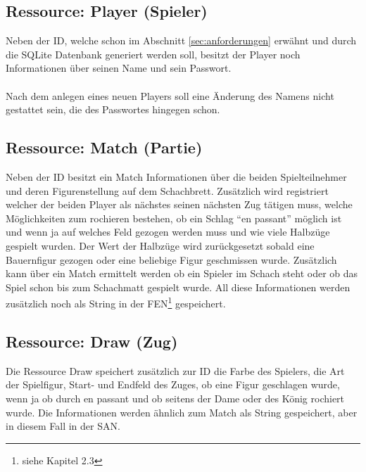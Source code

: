 \subsection{Ressource: Player (Spieler)}\label{sec:resplayer}
Neben der ID, welche schon im Abschnitt \ref{sec:anforderungen} erwähnt und durch die SQLite Datenbank generiert werden soll, besitzt der Player noch Informationen über seinen Name und sein Passwort.\\
\\
Nach dem anlegen eines neuen Players soll eine Änderung des Namens nicht gestattet sein, die des Passwortes hingegen schon.

\subsection{Ressource: Match (Partie)}\label{sec:resmatch}
Neben der ID besitzt ein Match Informationen über die beiden Spielteilnehmer und deren Figurenstellung auf dem Schachbrett. Zusätzlich wird registriert welcher der beiden Player als nächstes seinen nächsten Zug tätigen muss, welche Möglichkeiten zum rochieren bestehen, ob ein Schlag \enquote{en passant} möglich ist und wenn ja auf welches Feld gezogen werden muss und wie viele Halbzüge gespielt wurden. Der Wert der Halbzüge wird zurückgesetzt sobald eine Bauernfigur gezogen oder eine beliebige Figur geschmissen wurde. Zusätzlich kann über ein Match ermittelt werden ob ein Spieler im Schach steht oder ob das Spiel schon bis zum Schachmatt gespielt wurde. All diese Informationen werden zusätzlich noch als String in der \gls{FEN}\footnote{\label{foot:chapter}siehe Kapitel 2.3} gespeichert.

\subsection{Ressource: Draw (Zug)}\label{sec:resdraw}
Die Ressource Draw speichert zusätzlich zur ID die Farbe des Spielers, die Art der Spielfigur, Start- und Endfeld des Zuges, ob eine Figur geschlagen wurde, wenn ja ob durch en passant und ob seitens der Dame oder des König rochiert wurde. Die Informationen werden ähnlich zum Match als String gespeichert, aber in diesem Fall in der \gls{SAN}.

